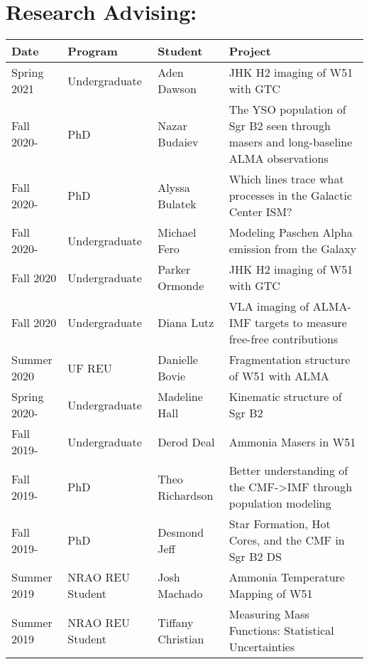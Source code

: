 \setlength{\extrarowheight}{4pt}
\section*{Research Advising: }
\vspace{-12pt}
\begin{tabular}{p{0.75in}p{1.3in}lp{2.6in}}
    Date  & Program & Student &  Project \\
    \hline
    Spring 2021 & Undergraduate &                               Aden Dawson    &  JHK H2 imaging of W51 with GTC \\
    Fall 2020- & PhD &                                         Nazar Budaiev    & The YSO population of Sgr B2 seen through masers and long-baseline ALMA observations  \\
    Fall 2020- & PhD &                                         Alyssa Bulatek    & Which lines trace what processes in the Galactic Center ISM?  \\
    Fall 2020- & Undergraduate &                               Michael Fero    &  Modeling Paschen Alpha emission from the Galaxy \\
    Fall 2020 & Undergraduate &                               Parker Ormonde    &  JHK H2 imaging of W51 with GTC \\
    Fall 2020 & Undergraduate &                               Diana Lutz    &  VLA imaging of ALMA-IMF targets to measure free-free contributions \\
    Summer 2020 & UF REU &                               Danielle Bovie    &  Fragmentation structure of W51 with ALMA \\
    Spring 2020- & Undergraduate &                               Madeline Hall    &  Kinematic structure of Sgr B2 \\
    Fall 2019- & Undergraduate &                               Derod Deal    &  Ammonia Masers in W51 \\
    Fall 2019- & PhD &                                         Theo Richardson    & Better understanding of the CMF->IMF through population modeling  \\
    Fall 2019- & PhD &                                         Desmond Jeff    &  Star Formation, Hot Cores, and the CMF in Sgr B2 DS \\
    Summer 2019 & NRAO REU Student &                                              Josh Machado    &  Ammonia Temperature Mapping of W51 \\
    Summer 2019 & NRAO REU Student &                                              Tiffany Christian    &  Measuring Mass Functions: Statistical Uncertainties \\

\end{tabular}
